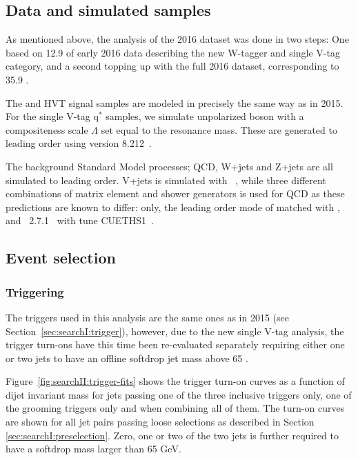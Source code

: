 \subsection{Data and simulated samples}
\label{sec:searchII:samples}
As mentioned above, the analysis of the 2016 dataset was done in two steps: One based on 12.9 \fbinv of early 2016 data describing the new W-tagger and single V-tag category, and a second topping up with the full 2016 dataset, corresponding to 35.9 \fbinv.\par
The \BulkG and HVT signal samples are modeled in precisely the same way as in 2015. For the single V-tag $\textrm{q}^*$ samples, we simulate unpolarized boson with a compositeness scale $\Lambda$ set equal to the resonance mass. These are generated to leading order using \PYTHIA version 8.212~\cite{Sjostrand:2007gs}. \par
The background Standard Model processes; QCD, W+jets and Z+jets are all simulated to leading order. V+jets is simulated with \amcatnlo~\cite{Alwall:2014hca,Alwall:2007fs}, while three different combinations of matrix element and shower generators is used for QCD as these predictions are known to differ: \PYTHIA only, the leading order mode of \amcatnlo{} matched with \PYTHIA, and \HERWIG{++}~2.7.1~\cite{Bahr:2008pv} with tune CUETHS1~\cite{Khachatryan:2015pea}.

\subsection{Event selection}

\subsubsection{Triggering}

The triggers used in this analysis are the same ones as in 2015 (see Section~\ref{sec:searchI:trigger}), however, due to the new single V-tag analysis, the trigger turn-ons have this time been re-evaluated separately requiring either one or two jets to have an offline softdrop jet mass above 65 \GeV.
\par Figure~\ref{fig:searchII:trigger-fits} shows the trigger turn-on curves as a function of dijet invariant mass for jets passing one of the three inclusive triggers only, one of the grooming triggers only and when combining all of them. The turn-on curves are shown for all jet pairs passing loose selections as described in Section \ref{sec:searchI:preselection}. Zero, one or two of the two jets is further required to have a softdrop mass larger than 65 GeV.

